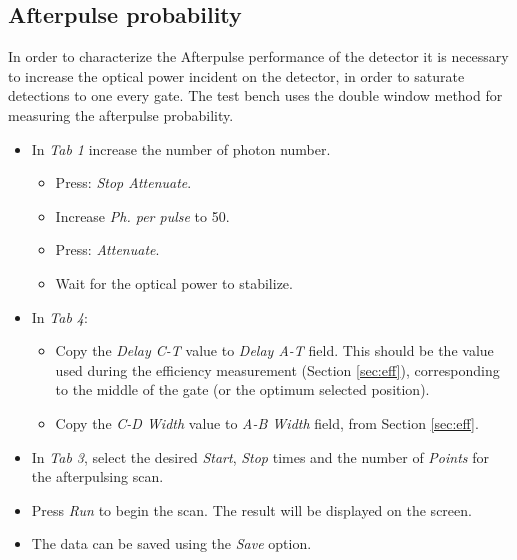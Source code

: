 \documentclass{article}
\begin{document}

\subsection{Afterpulse probability}

In order to characterize the Afterpulse performance of the detector it is necessary to increase the optical power incident on the detector, in order to saturate detections to one every gate. The test bench uses the double window method for measuring the afterpulse probability.

\begin{itemize}
\item
In \emph{Tab 1} increase the number of photon number.
\begin{itemize}
\item
Press: \emph{Stop Attenuate}.
\item
Increase \emph{Ph. per pulse} to 50.
\item
Press: \emph{Attenuate}.
\item
Wait for the optical power to stabilize.
\end{itemize}

\item
In \emph{Tab 4}:
\begin{itemize}
\item
Copy the \emph{Delay C-T} value to \emph{Delay A-T} field. This should be the value used during the efficiency measurement (Section \ref{sec:eff}), corresponding to the middle of the gate (or the optimum selected position).
\item
Copy the \emph{C-D Width} value to \emph{A-B Width} field, from Section \ref{sec:eff}. 
\end{itemize}

\item
In \emph{Tab 3}, select the desired \emph{Start}, \emph{Stop} times and the number of \emph{Points} for the afterpulsing scan.
\item
Press \emph{Run} to begin the scan. The result will be displayed on the screen. 
\item
The data can be saved using the \emph{Save} option.

\end{itemize}
\end{document}
